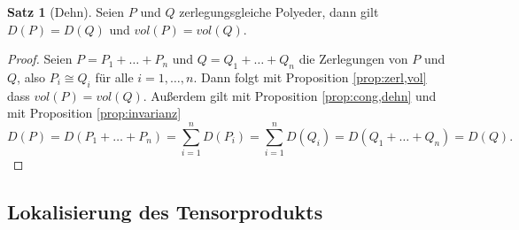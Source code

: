 \documentclass[11pt,titlepage]{article}
\theoremstyle{definition}
\newtheorem{theorem}{Satz}[section]
\theoremstyle{remark}
\begin{document}
	\begin{theorem}[Dehn] \label{thm:dehn}
		Seien $P$ und $Q$ zerlegungsgleiche Polyeder, dann gilt $D(P)=D(Q)$ und $vol(P)=vol(Q)$.
	\end{theorem}
	
	\begin{proof}
		Seien $P=P_1+\ldots+P_n$ und $Q=Q_1+\ldots+Q_n$ die Zerlegungen von $P$ und 
		$Q$, also $P_i\cong Q_i$ für alle $i=1,\ldots,n$. Dann folgt mit Proposition \ref{prop:zerl,vol}
		dass $vol(P)=vol(Q)$. Außerdem gilt mit Proposition \ref{prop:cong,dehn}
		und mit Proposition \ref{prop:invarianz}
		\[D(P)=D(P_1+\ldots+P_n)=\sum_{i=1}^n D(P_i) =\sum_{i=1}^n D(Q_i)=D(Q_1+\ldots+Q_n)=D(Q).\]
	\end{proof}
	
	\subsection{Lokalisierung des Tensorprodukts}
	
\end{document}
